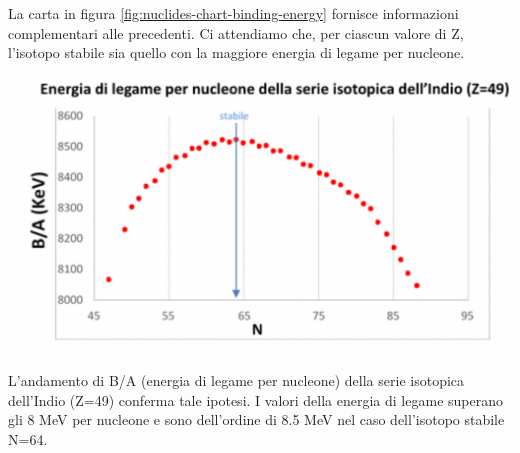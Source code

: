 La carta in figura \ref{fig:nuclides-chart-binding-energy} fornisce informazioni complementari alle precedenti.
Ci attendiamo che, per ciascun valore di Z, l’isotopo stabile sia quello con la maggiore energia di legame per nucleone.
\begin{marginfigure}
    \centering
    \includegraphics{../figs/indium-binding-energy}
    \label{fig:}
\end{marginfigure}
L’andamento di B/A (energia di legame per nucleone) della serie isotopica dell’Indio (Z=49) conferma tale ipotesi.
I valori della energia di legame superano gli 8 MeV per nucleone e sono dell’ordine di 8.5 MeV nel caso dell’isotopo stabile N=64.

